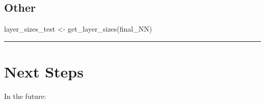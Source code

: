 \documentclass[
]{book}
\newenvironment{Shaded}{\begin{snugshade}}{\end{snugshade}}
\newcommand{\ControlFlowTok}[1]{\textcolor[rgb]{0.13,0.29,0.53}{\textbf{#1}}}
\newcommand{\DecValTok}[1]{\textcolor[rgb]{0.00,0.00,0.81}{#1}}
\newcommand{\DocumentationTok}[1]{\textcolor[rgb]{0.56,0.35,0.01}{\textbf{\textit{#1}}}}
\newcommand{\FunctionTok}[1]{\textcolor[rgb]{0.00,0.00,0.00}{#1}}
\newcommand{\NormalTok}[1]{#1}
\newcommand{\OtherTok}[1]{\textcolor[rgb]{0.56,0.35,0.01}{#1}}
\newcommand{\SpecialCharTok}[1]{\textcolor[rgb]{0.00,0.00,0.00}{#1}}
\begin{document}
\hypertarget{other}{%
\subsection{Other}\label{other}}

\begin{Shaded}
\end{Shaded}

\begin{Shaded}
\begin{Highlighting}[]
\NormalTok{layer\_sizes\_test }\OtherTok{\textless{}{-}} \FunctionTok{get\_layer\_sizes}\NormalTok{(final\_NN)}
\end{Highlighting}
\end{Shaded}

\begin{center}\rule{0.5\linewidth}{0.5pt}\end{center}

\hypertarget{next-steps}{%
\section{Next Steps}\label{next-steps}}

In the future:
\end{document}
